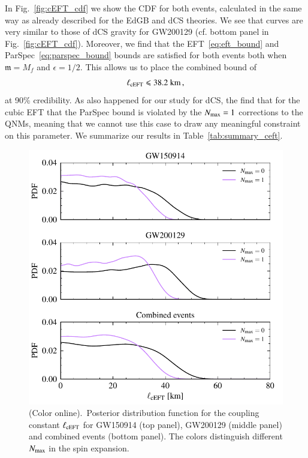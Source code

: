\documentclass[twocolumn,
               prd,
               aps,
               superscriptaddress,
               tightenlines,
               nofootinbib,
               eqsecnum,
               amsfonts,
               amsmath,
               longbibliography]{revtex4-1}
\begin{document}
In Fig.~\ref{fig:cEFT_cdf} we show the CDF for both events, calculated in the
same way as already described for the EdGB and dCS theories.
%
We see that curves are very similar to those of dCS gravity for GW200129 (cf.
bottom panel in Fig.~\ref{fig:cEFT_cdf}).
%
Moreover, we find that the EFT~\eqref{eq:eft_bound} and
ParSpec~\eqref{eq:parspec_bound} bounds are satisfied for both events both when
$\mathfrak{m} = M_f$ and $\epsilon = 1/2$.
%
This allows us to place the combined bound of
%
\begin{equation}
    \ell_{\rm cEFT} \leqslant 38.2~\textrm{km}\,,
\end{equation}
%
at 90\% credibility. As also happened for our study for dCS, the find that for
the cubic EFT that the ParSpec bound is violated by the $N_{\rm max} = 1$ corrections to
the QNMs, meaning that we cannot use this case to draw any meaningful
constraint on this parameter.
%
We summarize our results in Table~\ref{tab:summary_ceft}.

\begin{figure}[t]
\includegraphics[width=\columnwidth]{figs/ceft_posteriors_combined.pdf}
\caption{(Color online).~Posterior distribution function for the coupling constant $\ell_{\rm cEFT}$ for
GW150914 (top panel), GW200129 (middle panel) and combined events (bottom panel).
%
The colors distinguish different $N_{\rm max}$ in the spin expansion.
}
\label{fig:cEFT_exec_sum}
\end{figure}
\end{document}
